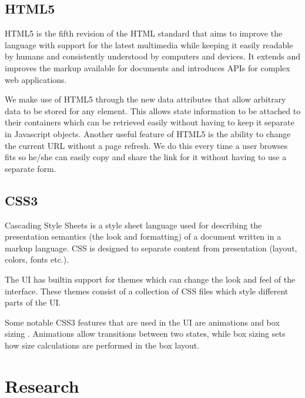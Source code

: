 \subsection{HTML5}
HTML5 \cite{html5} is the fifth revision of the HTML standard that aims to improve the language with support for the latest multimedia while keeping it easily readable by humans and consistently understood by computers and devices. It extends and improves the markup available for documents and introduces APIs for complex web applications.

We make use of HTML5 through the new data attributes \cite{html5data} that allow arbitrary data to be stored for any element. This allows state information to be attached to their containers which can be retrieved easily without having to keep it separate in Javascript objects. Another useful feature of HTML5 is the ability to change the current URL without a page refresh. We do this every time a user browses fits so he/she can easily copy and share the link for it without having to use a separate form.

\subsection{CSS3}
Cascading Style Sheets \cite{css} is a style sheet language used for describing the presentation semantics (the look and formatting) of a document written in a markup language. CSS is designed to separate content from presentation (layout, colors, fonts etc.).

The UI has builtin support for themes which can change the look and feel of the interface. These themes consist of a collection of CSS files which style different parts of the UI.

Some notable CSS3 features that are used in the UI are animations \cite{cssanimations} and box sizing \cite{cssboxsizing}. Animations allow transitions between two states, while box sizing sets how size calculations are performed in the box layout.

\section{Research}
